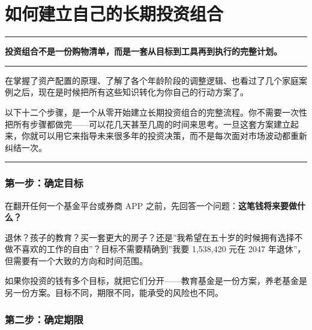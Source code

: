 \documentclass[a4paper,11pt,oneside,fontset=none,UTF8,zihao=-4]{ctexbook}
\begin{document}
\newpage

\chapter{如何建立自己的长期投资组合}\label{ux5982ux4f55ux5efaux7acbux81eaux5df1ux7684ux957fux671fux6295ux8d44ux7ec4ux5408}

\begin{center}{\color{dh-bronze}\rule{0.2\textwidth}{0.5pt}}\end{center}

\begin{dhquote}
\textbf{投资组合不是一份购物清单，而是一套从目标到工具再到执行的完整计划。}
\end{dhquote}

\begin{center}{\color{dh-bronze}\rule{0.2\textwidth}{0.5pt}}\end{center}

在掌握了资产配置的原理、了解了各个年龄阶段的调整逻辑、也看过了几个家庭案例之后，现在是时候把所有这些知识转化为你自己的行动方案了。

以下十二个步骤，是一个从零开始建立长期投资组合的完整流程。你不需要一次性把所有步骤都做完------可以花几天甚至几周的时间来思考。一旦这套方案建立起来，你就可以用它来指导未来很多年的投资决策，而不是每次面对市场波动都重新纠结一次。

\begin{center}{\color{dh-bronze}\rule{0.2\textwidth}{0.5pt}}\end{center}

\subsection{第一步：确定目标}\label{ux7b2cux4e00ux6b65ux786eux5b9aux76eeux6807}

在翻开任何一个基金平台或券商 APP
之前，先回答一个问题：\textbf{这笔钱将来要做什么？}

退休？孩子的教育？买一套更大的房子？还是''我希望在五十岁的时候拥有选择不做不喜欢的工作的自由''？目标不需要精确到''我要
1,538,420 元在 2047 年退休''，但需要有一个大致的方向和时间范围。

如果你投资的钱有多个目标，就把它们分开------教育基金是一份方案，养老基金是另一份方案。目标不同，期限不同，能承受的风险也不同。

\subsection{第二步：确定期限}\label{ux7b2cux4e8cux6b65ux786eux5b9aux671fux9650}
\end{document}
